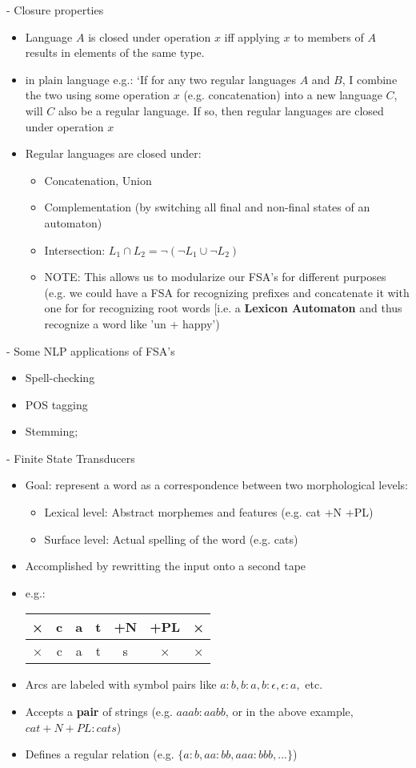 \documentclass[11pt]{article}
\newenvironment{itemise}{
\begin{itemize}
  \setlength{\itemsep}{1pt}
  \setlength{\parskip}{0pt}
  \setlength{\parsep}{0pt}
}{\end{itemize}}
\begin{document}
- Closure properties
\begin{itemise}
 \item Language $A$ is closed under operation $x$ iff applying $x$ to members of $A$ results in elements of the same type.
 \item in plain language e.g.: `If for any two regular languages $A$ and $B$, I combine the two using some operation $x$ (e.g. concatenation) into a new language $C$, will $C$ also be a regular language. If so, then regular languages are closed under operation $x$ 
 \item Regular languages are closed under:
  \begin{itemise}
   \item Concatenation, Union
   \item Complementation (by switching all final and non-final states of an automaton)
   \item Intersection: $L_1 \cap L_2 =  \neg(\neg L_1 \cup \neg L_2)$
   \item NOTE: This allows us to modularize our FSA's for different purposes (e.g. we could have a FSA for recognizing prefixes and concatenate it with one for for recognizing root words [i.e. a {\bf Lexicon Automaton} and thus recognize a word like 'un + happy')
  \end{itemise}
\end{itemise}
- Some NLP applications of FSA's
\begin{itemise}
 \item Spell-checking
 \item POS tagging
 \item Stemming;
\end{itemise}
- Finite State Transducers
\begin{itemise}
 \item Goal: represent a word as a correspondence between two morphological levels:
  \begin{itemise}
   \item Lexical level: Abstract morphemes and features (e.g. cat +N +PL)
   \item Surface level: Actual spelling of the word (e.g. cats)
  \end{itemise}
 \item Accomplished by rewritting the input onto a second tape
 \item e.g.: 
\begin{center}
\begin{tabular}{|c|c|c|c|c|c|c|}\hline
× & c & a & t & +N & +PL & ×\\\hline
× & c & a & t & s & × & ×\\\hline
\end{tabular}
\end{center}
 \item Arcs are labeled with symbol pairs like $a:b, b:a, b:\epsilon, \epsilon:a,$ etc.
 \item Accepts a {\bf pair} of strings (e.g. $aaab:aabb$, or in the above example, $cat+N+PL:cats$)
 \item Defines a regular relation (e.g. $\{ a:b, aa:bb, aaa:bbb, ...\}$)
\end{itemise}
\end{document}
